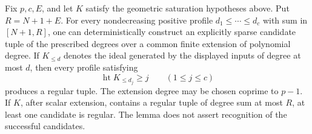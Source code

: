 \begin{lemma}
\label{sci:lem:profile-candidates}
Fix \(p,c,E\), and let \(K\) satisfy the geometric saturation
hypotheses above. Put \(R=N+1+E\). For every nondecreasing positive
profile \(d_1\leq\cdots\leq d_c\) with sum in \([N+1,R]\),
one can deterministically construct an explicitly sparse candidate tuple
of the prescribed degrees over a common finite extension of polynomial
degree. If \(K_{\leq d}\) denotes the ideal generated by the displayed
inputs of degree at most \(d\), then every profile satisfying
\[
 \operatorname{ht}K_{\leq d_j}\geq j\qquad(1\leq j\leq c)
 \tag{\(\star\)}
\]
produces a regular tuple. The extension degree may be chosen coprime to
\(p-1\). If \(K\), after scalar extension, contains a regular tuple
of degree sum at most \(R\), at least one candidate is regular.
The lemma does not assert recognition of the successful candidates.
\end{lemma}

